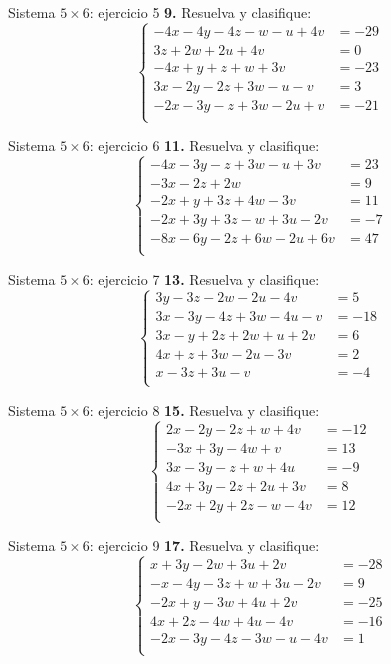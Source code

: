 \documentclass[aspectratio=169,9pt]{beamer}
\theoremstyle{remark}
\begin{document}
\begin{frame}{Sistema $5\times 6$: ejercicio 5}
\scriptsize
\textbf{9.} Resuelva y clasifique:
\[\left\{\begin{aligned}
-4x-4y-4z-w-u+4v&=-29\\
3z+2w+2u+4v&=0\\
-4x+y+z+w+3v&=-23\\
3x-2y-2z+3w-u-v&=3\\
-2x-3y-z+3w-2u+v&=-21\\
\end{aligned}\right.\]
\end{frame}
\begin{frame}{Sistema $5\times 6$: ejercicio 6}
\scriptsize
\textbf{11.} Resuelva y clasifique:
\[\left\{\begin{aligned}
-4x-3y-z+3w-u+3v&=23\\
-3x-2z+2w&=9\\
-2x+y+3z+4w-3v&=11\\
-2x+3y+3z-w+3u-2v&=-7\\
-8x-6y-2z+6w-2u+6v&=47\\
\end{aligned}\right.\]
\end{frame}
\begin{frame}{Sistema $5\times 6$: ejercicio 7}
\scriptsize
\textbf{13.} Resuelva y clasifique:
\[\left\{\begin{aligned}
3y-3z-2w-2u-4v&=5\\
3x-3y-4z+3w-4u-v&=-18\\
3x-y+2z+2w+u+2v&=6\\
4x+z+3w-2u-3v&=2\\
x-3z+3u-v&=-4\\
\end{aligned}\right.\]
\end{frame}
\begin{frame}{Sistema $5\times 6$: ejercicio 8}
\scriptsize
\textbf{15.} Resuelva y clasifique:
\[\left\{\begin{aligned}
2x-2y-2z+w+4v&=-12\\
-3x+3y-4w+v&=13\\
3x-3y-z+w+4u&=-9\\
4x+3y-2z+2u+3v&=8\\
-2x+2y+2z-w-4v&=12\\
\end{aligned}\right.\]
\end{frame}
\begin{frame}{Sistema $5\times 6$: ejercicio 9}
\scriptsize
\textbf{17.} Resuelva y clasifique:
\[\left\{\begin{aligned}
x+3y-2w+3u+2v&=-28\\
-x-4y-3z+w+3u-2v&=9\\
-2x+y-3w+4u+2v&=-25\\
4x+2z-4w+4u-4v&=-16\\
-2x-3y-4z-3w-u-4v&=1\\
\end{aligned}\right.\]
\end{frame}
\end{document}
